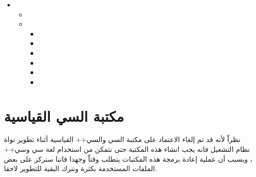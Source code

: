 \documentclass[document.tex]{subfiles}
\begin{document}
\begin{english}

\begin{itemize}
\item {}

\begin{itemize}
\item {}


\item {}
\begin{itemize}
\item {}
\item {}
\item {}
\item {}
\item {}
\item {}
\end{itemize}

\end{itemize}
\end{itemize}
\end{english}

\section{مكتبة السي القياسية}
نظراّ لأنه قد تم إلغاء الاعتماد على مكتبة السي والسي++ القياسية أثناء تطوير نواة نظام التشغيل فانه يجب انشاء هذه المكتبة حتى نتمكن من استخدام لغة سي وسي++ ، وبسبب أن عملية إعادة برمجة هذه المكتبات يتطلب وقتاّ وجهدا فاننا سنركز على بعض الملفات المستخدمة بكثرة ونترك البقية للتطوير لاحقا.
\end{document}
